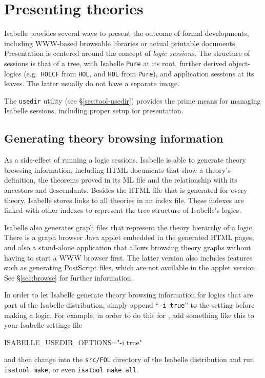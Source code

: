 

\chapter{Presenting theories}

Isabelle provides several ways to present the outcome of formal developments,
including WWW-based browsable libraries or actual printable documents.
Presentation is centered around the concept of \emph{logic sessions}.  The
structure of sessions is that of a tree, with Isabelle \texttt{Pure} at its
root, further derived object-logics (e.g.\ \texttt{HOLCF} from \texttt{HOL},
and \texttt{HOL} from \texttt{Pure}), and application sessions at its leaves.
The latter usually do not have a separate {\ML} image.

The \texttt{usedir} utility (see \S\ref{sec:tool-usedir}) provides the prime
means for managing Isabelle sessions, including proper setup for presentation.


\section{Generating theory browsing information} \label{sec:info}

As a side-effect of running a logic sessions, Isabelle is able to generate
theory browsing information, including HTML documents that show a theory's
definition, the theorems proved in its ML file and the relationship with its
ancestors and descendants.  Besides the HTML file that is generated for every
theory, Isabelle stores links to all theories in an index file. These indexes
are linked with other indexes to represent the tree structure of Isabelle's
logics.

Isabelle also generates graph files that represent the theory hierarchy of a
logic.  There is a graph browser Java applet embedded in the generated HTML
pages, and also a stand-alone application that allows browsing theory graphs
without having to start a WWW browser first.  The latter version also includes
features such as generating {\sc PostScript} files, which are not available in
the applet version.  See \S\ref{sec:browse} for further information.

\medskip

In order to let Isabelle generate theory browsing information for logics that
are part of the Isabelle distribution, simply append ``\texttt{-i true}'' to
the  setting before making a logic.  For
example, in order to do this for {\FOL}, add something like this to your
Isabelle settings file
\begin{ttbox}
ISABELLE_USEDIR_OPTIONS="-i true"
\end{ttbox}
and then change into the \texttt{src/FOL} directory of the Isabelle
distribution and run \texttt{isatool make}, or even \texttt{isatool make all}.

